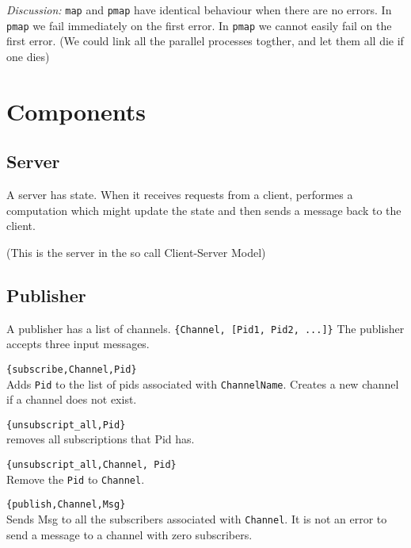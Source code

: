 \documentclass[10pt]{article}
\begin{document}
{\sl Discussion:} \verb+map+ and \verb+pmap+ have identical behaviour
when there are no errors. In \verb+pmap+ we fail immediately on the
first error. In \verb+pmap+ we cannot easily fail on the first error.
(We could link all the parallel processes togther, and let them all
die if one dies)

\section{Components}

\subsection{Server}

A server has state. When it receives requests from a client,
performes a computation which might update the state and then sends
a message back to the client.

(This is the server in the so call Client-Server Model)

\subsection{Publisher}

A publisher has a list of channels. \verb+{Channel, [Pid1, Pid2, ...]}+
The publisher accepts three input messages.

\begin{description}

\item \verb+{subscribe,Channel,Pid}+\\
  Adds \verb+Pid+ to the list
  of pids associated with \verb+ChannelName+. Creates a new channel if
  a channel does not exist.

\item \verb+{unsubscript_all,Pid}+\\
removes all subscriptions that Pid has.

\item \verb+{unsubscript_all,Channel, Pid}+\\
Remove the \verb+Pid+ to \verb+Channel+.
  
\item \verb+{publish,Channel,Msg}+\\ 
Sends Msg to all the subscribers associated with
\verb+Channel+. It is not an error to send a message to a channel with
zero subscribers.

\end{description}
\end{document}
